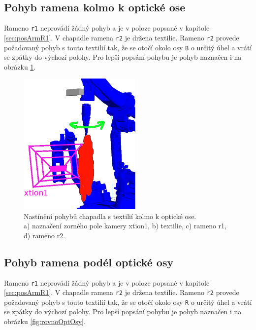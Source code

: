 \documentclass[10pt,a4paper,titlepage,oneside]{report}
\begin{document}
\subsection{Pohyb ramena kolmo k optické ose}
Rameno \verb|r1| neprovádí žádný pohyb a je v poloze popsané v kapitole \ref{sec:posArmR1}. V chapadle ramena \verb|r2| je držena textilie. Rameno \verb|r2| provede požadovaný pohyb s touto textilií tak, že se otočí okolo osy \verb|B| o určitý úhel a vrátí se zpátky do výchozí polohy. Pro lepší popsání pohybu je pohyb naznačen i na obrázku \ref{fig:kolmoOptOsy}.
\\
\begin{figure}[H]
	\centering  	
  	\includegraphics[height=7cm]{pictures/move1.eps}
  	\caption{Nastínění pohybů chapadla s textilií kolmo k optické ose.\\
  	a) naznačení zorného pole kamery xtion1, b) textilie, c) rameno r1, d) rameno r2.
  	}
  	\label{fig:kolmoOptOsy}
\end{figure}

\newpage
\subsection{Pohyb ramena podél optické osy}
Rameno \verb|r1| neprovádí žádný pohyb a je v poloze popsané v kapitole \ref{sec:posArmR1}. V chapadle ramena \verb|r2| je držena textilie. Rameno \verb|r2| provede požadovaný pohyb s touto textilií tak, že se otočí okolo osy \verb|R| o určitý úhel a vrátí se zpátky do výchozí polohy. Pro lepší popsání pohybu je pohyb naznačen i na obrázku \ref{fig:rovnoOptOsy}.
\\
\end{document}
